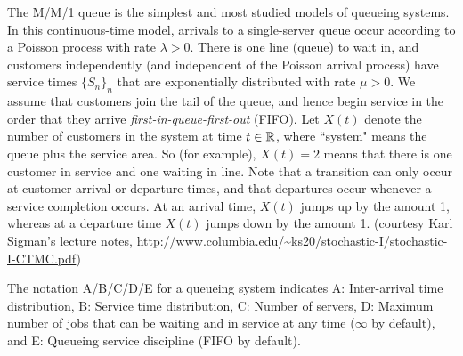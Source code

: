 \documentclass[a4paper,10pt,english]{article}
\begin{document}
\begin{shaded*}
\begin{exmp}
The M/M/1 queue is the simplest and most studied models of queueing systems. In this continuous-time model, arrivals to a single-server queue occur according to a Poisson process with rate $\lambda > 0$. There
is one line (queue) to wait in, and customers independently (and independent of the
Poisson arrival process) have service times $\{S_n\}_{n}$ that are exponentially distributed with rate $\mu > 0$. We assume that customers join the tail of the queue, and hence begin service in the order that they arrive {\em first-in-queue-first-out} (FIFO). Let $X(t)$ denote the number of customers in the system at time $t \in \mathbb{R}$, where ``system"
means the queue plus the service area. So (for example), $X(t) = 2$ means that there
is one customer in service and one waiting in line. Note that a transition can only
occur at customer arrival or departure times, and that departures occur whenever
a service completion occurs. At an arrival time,  $X(t)$ jumps up by the amount 1,
whereas at a departure time $X(t)$ jumps down by the amount 1. (courtesy Karl Sigman's lecture notes, \url{http://www.columbia.edu/~ks20/stochastic-I/stochastic-I-CTMC.pdf})
\begin{note}
The notation A/B/C/D/E for a queueing system indicates A: Inter-arrival time distribution, B: Service time distribution, C: Number of servers, D: Maximum number of jobs that can be waiting and in service at any time ($\infty$ by default), and E: Queueing service discipline (FIFO by default). 
\end{note}

\end{exmp}
\end{shaded*}
\end{document}
